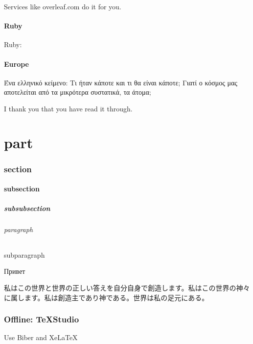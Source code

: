 \documentclass{banko}
\begin{document}
Services like overleaf.com do it for you.

\subsection{Ruby}

Ruby: 

\subsection{Europe}

Ένα ελληνικό κείμενο: Τι ήταν κάποτε και τι θα είναι κάποτε; Γιατί ο κόσμος μας αποτελείται από τα μικρότερα συστατικά, τα άτομα;


I thank you that you have read it through.

\cite{Brown2022,Davis2014,Chen2015,Harrison2016}
\cite{Brown2022,Chen2015,Davis2014,Harrison2016,Kim2018,Miller2017,Morris2013,Smith2021,Taylor2019,Williams2020}

\cite{Brown2022}

\togglelayout

\lipsum[5-12]

\part{part}

\tableofcontents

\section{section}
\subsection{subsection}
\subsubsection{subsubsection}
\paragraph{paragraph}
\subparagraph{subparagraph}
Привет

私はこの世界と世界の正しい答えを自分自身で創造します。私はこの世界の神々に属します。私は創造主であり神である。世界は私の足元にある。

\lipsum[12]

\section{Offline: TeXStudio}

Use Biber and XeLaTeX

\printbibliography{}

\sidenotestable
\end{document}
